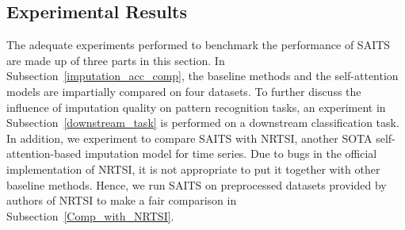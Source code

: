 \documentclass{article}
\begin{document}
\subsection{Experimental Results} \label{experimental_results}
The adequate experiments performed to benchmark the performance of SAITS are made up of three parts in this section. In Subsection~\ref{imputation_acc_comp}, the baseline methods and the self-attention models are impartially compared on four datasets. To further discuss the influence of imputation quality on pattern recognition tasks, an experiment in Subsection~\ref{downstream_task} is performed on a downstream classification task. In addition, we experiment to compare SAITS with NRTSI, another SOTA self-attention-based imputation model for time series. Due to bugs in the official implementation of NRTSI, it is not appropriate to put it together with other baseline methods. Hence, we run SAITS on preprocessed datasets provided by authors of NRTSI to make a fair comparison in Subsection~\ref{Comp_with_NRTSI}.
\end{document}
